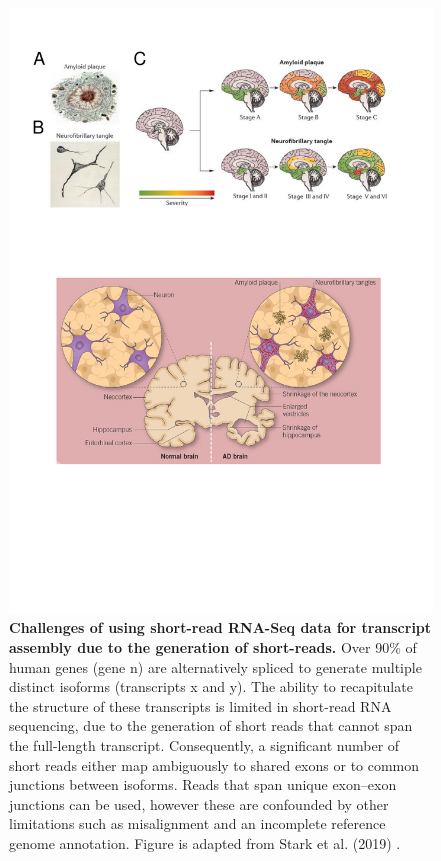 \begin{landscape}
	\begin{figure}[htp]
		\centering
		\includegraphics[page=10,trim={0 19cm 2cm 1cm},clip, scale = 1]{Figures/Introduction_Figures.pdf}
		\captionsetup{width=1.2\textwidth}
		\caption[Challenges of using short-read RNA-Seq data for transcriptome profiling studies]%
		{\textbf{Challenges of using short-read RNA-Seq data for transcript assembly due to the generation of short-reads.} Over 90\% of human genes (gene n) are alternatively spliced to generate multiple distinct isoforms (transcripts x and y). The ability to recapitulate the structure of these transcripts is limited in short-read RNA sequencing, due to the generation of short reads that cannot span the full-length transcript. Consequently, a significant number of short reads either map ambiguously to shared exons or to common junctions between isoforms. Reads that span unique exon–exon junctions can be used, however these are confounded by other limitations such as misalignment and an incomplete reference genome annotation. Figure is adapted from Stark et al. (2019) \cite{Stark2019}.}
		\label{fig:rna_seq_limitations}
	\end{figure}
\end{landscape}



